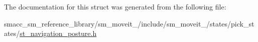 The documentation for this struct was generated from the following file\+:\begin{DoxyCompactItemize}
\item 
smacc\+\_\+sm\+\_\+reference\+\_\+library/sm\+\_\+moveit\+\_/include/sm\+\_\+moveit\+\_/states/pick\+\_\+states/\hyperlink{2_2include_2sm__moveit__2_2states_2pick__states_2st__navigation__posture_8h}{st\+\_\+navigation\+\_\+posture.\+h}\end{DoxyCompactItemize}
